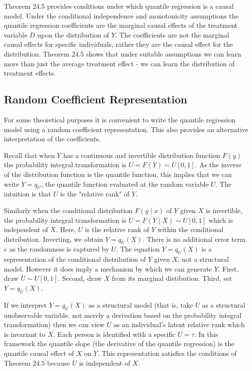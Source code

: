 \documentclass[10pt]{article}
\begin{document}
Theorem $24.5$ provides conditions under which quantile regression is a causal model. Under the conditional independence and monotonicity assumptions the quantile regression coefficients are the marginal causal effects of the treatment variable $D$ upon the distribution of $Y$. The coefficients are not the marginal causal effects for specific individuals, rather they are the causal effect for the distribution. Theorem $24.5$ shows that under suitable assumptions we can learn more than just the average treatment effect - we can learn the distribution of treatment effects.

\subsection{Random Coefficient Representation}
For some theoretical purposes it is convenient to write the quantile regression model using a random coefficient representation. This also provides an alternative interpretation of the coefficients.

Recall that when $Y$ has a continuous and invertible distribution function $F(y)$ the probability integral transformation is $U=F(Y) \sim U[0,1]$. As the inverse of the distribution function is the quantile function, this implies that we can write $Y=q_{U}$, the quantile function evaluated at the random variable $U$. The intuition is that $U$ is the "relative rank" of $Y$.

Similarly when the conditional distribution $F(y \mid x)$ of $Y$ given $X$ is invertible, the probability integral transformation is $U=F(Y \mid X) \sim U[0,1]$ which is independent of $X$. Here, $U$ is the relative rank of $Y$ within the conditional distribution. Inverting, we obtain $Y=q_{U}(X)$. There is no additional error term $e$ as the randomness is captured by $U$. The equation $Y=q_{U}(X)$ is a representation of the conditional distribution of $Y$ given $X$, not a structural model. However it does imply a mechanism by which we can generate $Y$. First, draw $U \sim U[0,1]$. Second, draw $X$ from its marginal distibution. Third, set $Y=q_{U}(X)$.

If we interpret $Y=q_{U}(X)$ as a structural model (that is, take $U$ as a structural unobservable variable, not merely a derivation based on the probability integral transformation) then we can view $U$ as an individual's latent relative rank which is invariant to $X$. Each person is identified with a specific $U=\tau$. In this framework the quantile slope (the derivative of the quantile regression) is the quantile causal effect of $X$ on $Y$. This representation satisfies the conditions of Theorem $24.5$ because $U$ is independent of $X$.
\end{document}
